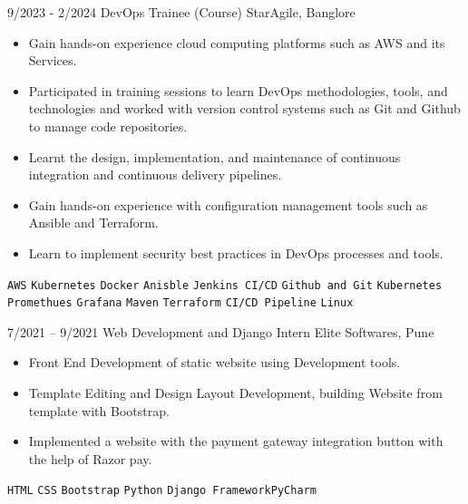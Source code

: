 \documentclass[9pt]{developercv} %
\begin{document}
\vspace{-10 pt}
\begin{entrylist}
    \entry
        {9/2023 - 2/2024}
		{DevOps Trainee (Course)}
		{StarAgile, Banglore}
		{\vspace{-10pt}
        \begin{itemize}[noitemsep,topsep=0pt,parsep=0pt,partopsep=0pt, leftmargin=-1pt]
            \item Gain hands-on experience cloud computing platforms such as AWS and its Services.
            \item Participated in training sessions to learn DevOps methodologies, tools, and technologies and worked with version control systems 
                  such as Git and Github to manage code repositories.
            \item Learnt the design, implementation, and maintenance of continuous integration and continuous delivery pipelines.
            \item Gain hands-on experience with configuration management tools such as Ansible and Terraform.
            \item Learn to implement security best practices in DevOps processes and tools.
        \end{itemize} 
        \texttt{AWS} \slashsep \texttt{Kubernetes} \slashsep \texttt{Docker} \slashsep \texttt{Anisble} \slashsep \texttt{Jenkins CI/CD} \slashsep \texttt{Github and Git} \slashsep \texttt{Kubernetes} \slashsep \texttt{Promethues} \slashsep \texttt{Grafana} \slashsep \texttt{Maven} \slashsep \texttt{Terraform} \slashsep \texttt{CI/CD Pipeline} \slashsep \texttt{Linux}}
	\entry
        {7/2021 -- 9/2021}
		{Web Development and Django Intern}
		{Elite Softwares, Pune}
		{\vspace{-10pt}
        \begin{itemize}[noitemsep,topsep=0pt,parsep=0pt,partopsep=0pt, leftmargin=-1pt]
            \item Front End Development of static website using Development tools.
            \item Template Editing and Design Layout Development, building Website from template with Bootstrap.
            \item Implemented a website with the payment gateway integration button with the help of Razor pay.
        \end{itemize} 
        \texttt{HTML} \slashsep \texttt{CSS} \slashsep \texttt{Bootstrap} \slashsep \texttt{Python} \slashsep \texttt{Django Framework}\slashsep \texttt{PyCharm}}
\end{entrylist}
\end{document}
